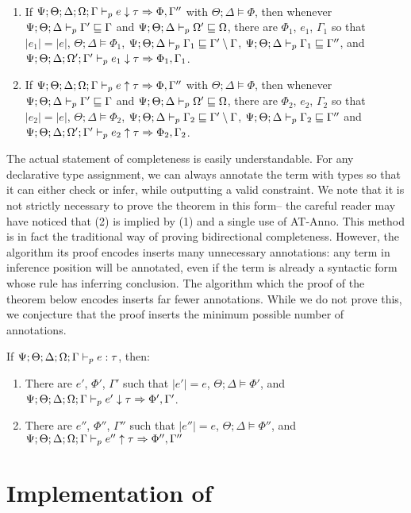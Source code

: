 \begin{theorem}
~\begin{enumerate}
  \item If $\Psi ; \Theta ; \Delta ; \Omega ; \Gamma \vdash_p e \downarrow \tau \Rightarrow \Phi,\Gamma''$ with $\Theta ; \Delta \vDash \Phi$, then whenever $\Psi ; \Theta ; \Delta \vdash_p \Gamma' \sqsubseteq \Gamma$ and $\Psi ; \Theta ; \Delta \vdash_p \Omega' \sqsubseteq \Omega$, there are $\Phi_1$, $e_1$, $\Gamma_1$ so that $|e_1| = |e|$, $\Theta ; \Delta \vDash \Phi_1$, $\Psi ; \Theta ; \Delta \vdash_p \Gamma_1 \sqsubseteq \Gamma' \setminus \Gamma$, $\Psi ; \Theta ; \Delta \vdash_p \Gamma_1 \sqsubseteq \Gamma''$, and $\Psi ; \Theta ; \Delta ; \Omega' ; \Gamma' \vdash_p e_1 \downarrow \tau \Rightarrow \Phi_1,\Gamma_1$.
  \item If $\Psi ; \Theta ; \Delta ; \Omega ; \Gamma \vdash_p e \uparrow \tau \Rightarrow \Phi,\Gamma''$ with $\Theta ; \Delta \vDash \Phi$, then whenever $\Psi ; \Theta ; \Delta \vdash_p \Gamma' \sqsubseteq \Gamma$ and $\Psi ; \Theta ; \Delta \vdash_p \Omega' \sqsubseteq \Omega$, there are $\Phi_2$, $e_2$, $\Gamma_2$ so that $|e_2| = |e|$, $\Theta ; \Delta \vDash \Phi_2$, $\Psi ; \Theta ; \Delta \vdash_p \Gamma_2 \sqsubseteq \Gamma' \setminus \Gamma$, $\Psi ; \Theta ; \Delta \vdash_p \Gamma_2 \sqsubseteq \Gamma''$ and $\Psi ; \Theta ; \Delta ; \Omega' ; \Gamma' \vdash_p e_2 \uparrow \tau \Rightarrow \Phi_2,\Gamma_2$.
\end{enumerate}
\label{thm:admits-weaken}
\end{theorem}

The actual statement of completeness is easily understandable. For any declarative type assignment, we can always annotate the term with types so that it can either check or infer, while outputting a valid constraint. We note that it is not strictly necessary to prove the theorem in this form-- the careful reader may have noticed that (2) is implied by (1) and a single use of AT-Anno. This method is in fact the traditional way of proving bidirectional completeness. However, the algorithm its proof encodes inserts many unnecessary annotations: any term in inference position will be annotated, even if the term is already a syntactic form whose rule has inferring conclusion. The algorithm which the proof of the theorem below encodes inserts far fewer annotations. While we do not prove this, we conjecture that the proof inserts the minimum possible number of annotations.

\begin{theorem}
If $\Psi;\Theta;\Delta;\Omega;\Gamma \vdash_p e : \tau$, then:
\begin{enumerate}
  \item There are $e'$, $\Phi'$, $\Gamma'$ such that $|e'| = e$, $\Theta ; \Delta \vDash \Phi'$, and $\Psi;\Theta;\Delta;\Omega;\Gamma \vdash_p e' \downarrow \tau \Rightarrow \Phi', \Gamma'$.
  \item There are $e''$, $\Phi''$, $\Gamma''$ such that $|e''| = e$, $\Theta ; \Delta \vDash \Phi''$, and $\Psi;\Theta;\Delta;\Omega;\Gamma \vdash_p e'' \uparrow \tau \Rightarrow \Phi'',\Gamma''$
\end{enumerate}
\label{thm:tycheck-compl}
\end{theorem}

\section{Implementation of \lambdaamor}
\label{sec:lambdaamor-impl}